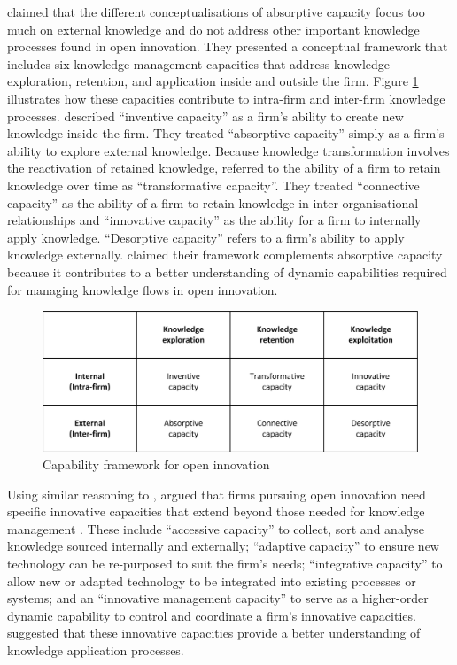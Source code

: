 \citet{lichtenthaler2009capability} claimed that the different conceptualisations of absorptive capacity focus too much on external knowledge and do not address other important knowledge processes found in open innovation. They presented a conceptual framework that includes six knowledge management capacities that address knowledge exploration, retention, and application inside and outside the firm. Figure \ref{fig:oiaccapabilityframework} illustrates how these capacities contribute to intra-firm and inter-firm knowledge processes. \citet{lichtenthaler2009capability} described \enquote{inventive capacity} as a firm’s ability to create new knowledge inside the firm. They treated \enquote{absorptive capacity} simply as a firm’s ability to explore external knowledge. Because knowledge transformation involves the reactivation of retained knowledge, \citet{lichtenthaler2009capability} referred to the ability of a firm to retain knowledge over time as \enquote{transformative capacity}. They treated \enquote{connective capacity} as the ability of a firm to retain knowledge in inter-organisational relationships and \enquote{innovative capacity} as the ability for a firm to internally apply knowledge. \enquote{Desorptive capacity} refers to a firm’s ability to apply knowledge externally. \citet{lichtenthaler2009absorptive} claimed their framework complements absorptive capacity because it contributes to a better understanding of dynamic capabilities required for managing knowledge flows in open innovation. \medskip

\begin{figure}
	\centering
	\includegraphics[width=0.7\linewidth]{Images/oi_ac_capability_framework}
	\caption[Capability framework for open innovation]{Capability framework for open innovation \citep{lichtenthaler2009capability}}
	\label{fig:oiaccapabilityframework}
\end{figure}

Using similar reasoning to \citet{lichtenthaler2009absorptive}, \citet{robertson2012managing} argued that firms pursuing open innovation need specific innovative capacities that extend beyond those needed for knowledge management \citep[e.g.][]{zahra2002absorptive,todorova2007absorptive,lichtenthaler2009capability}. These include \enquote{accessive capacity} to collect, sort and analyse knowledge sourced internally and externally; \enquote{adaptive capacity} to ensure new technology can be re-purposed to suit the firm's needs; \enquote{integrative capacity} to allow new or adapted technology to be integrated into existing processes or systems; and an \enquote{innovative management capacity} to serve as a higher-order dynamic capability to control and coordinate a firm's innovative capacities. \citet{robertson2012managing} suggested that these innovative capacities provide a better understanding of knowledge application processes. \medskip

